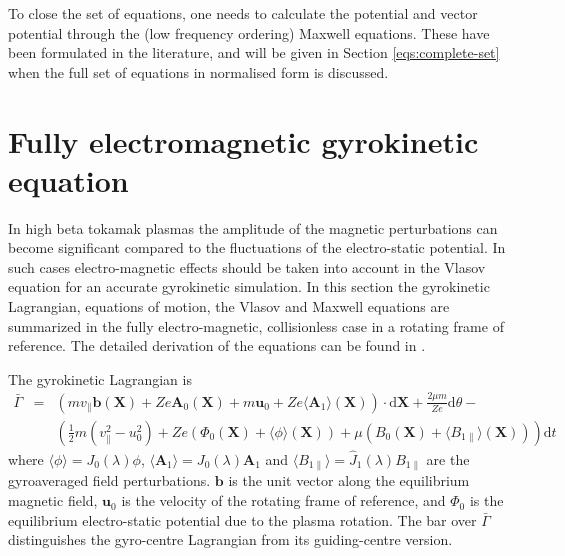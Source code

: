 To close the set of equations, one needs to calculate the potential and vector potential through the (low 
frequency ordering) Maxwell equations. These have been formulated in the literature, and 
will be given in Section \ref{eqs:complete-set} when the full set of equations in normalised form is discussed. 


\section{Fully electromagnetic gyrokinetic equation}
In high beta tokamak plasmas the amplitude of the magnetic perturbations can become significant compared to the fluctuations of the electro-static potential. In such cases electro-magnetic effects should be taken into account in the Vlasov equation for an accurate gyrokinetic simulation. In this section the gyrokinetic Lagrangian, equations of motion, the Vlasov and Maxwell equations are summarized in the fully electro-magnetic, collisionless case in a rotating frame of reference. The detailed derivation of the equations can be found in .

The gyrokinetic Lagrangian is
\begin{eqnarray}
	\bar{\Gamma} &=& \left( m v_{\parallel} \mathbf{b}(\mathbf{X}) + Z e \mathbf{A}_0(\mathbf{X}) + m \mathbf{u}_0 + Z e \langle \mathbf{A}_1 \rangle(\mathbf{X}) \right) \cdot \mathrm{d} \mathbf{X} + \frac{2 \mu m}{Z e} \mathrm{d} \theta - \nonumber\\
	&& \left( \frac{1}{2} m \left(v_{\parallel}^2 - u_0^2 \right) + Z e \left(\Phi_0(\mathbf{X}) + \langle \phi \rangle(\mathbf{X}) \right) + \mu \left(B_0(\mathbf{X}) + \langle B_{1 \parallel} \rangle(\mathbf{X})\right) \right) \mathrm{d}t
\end{eqnarray} 
where $\langle \phi \rangle = J_0(\lambda) \phi$, $\langle \mathbf{A}_1 \rangle = J_0(\lambda) \mathbf{A}_1$ and $\langle B_{1 \parallel} \rangle = \hat{J}_1(\lambda) B_{1 \parallel}$ are the gyroaveraged field perturbations. $\mathbf{b}$ is the unit vector along the equilibrium magnetic field, $\mathbf{u}_0$ is the velocity of the rotating frame of reference, and $\Phi_0$ is the equilibrium electro-static potential due to the plasma rotation. The bar over $\bar{\Gamma}$ distinguishes the gyro-centre Lagrangian from its guiding-centre version.

